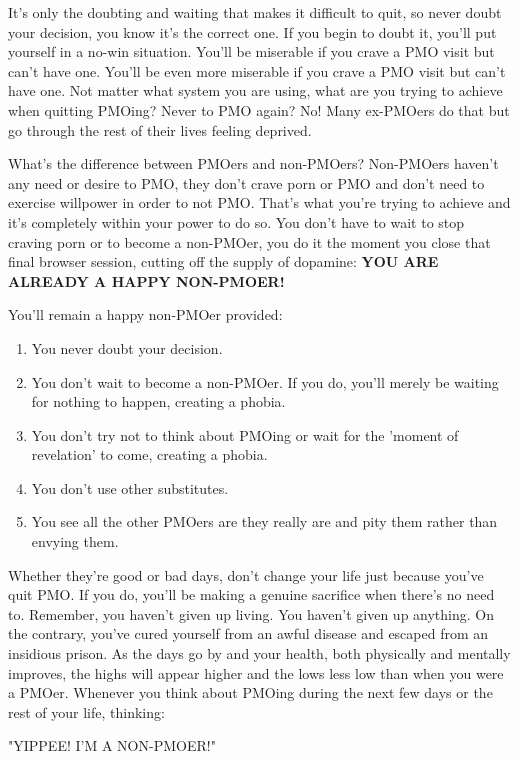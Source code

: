 \documentclass[easypeasy.tex]{subfiles}
\begin{document}
It's only the doubting and waiting that makes it difficult to quit, so never doubt your decision, you know it's the correct one. If you begin to doubt it, you'll put yourself in a no-win situation. You'll be miserable if you crave a PMO visit but can't have one. You'll be even more miserable if you crave a PMO visit but can't have one. Not matter what system you are using, what are you trying to achieve when quitting PMOing? Never to PMO again? No! Many ex-PMOers do that but go through the rest of their lives feeling deprived.

What's the difference between PMOers and non-PMOers? Non-PMOers haven't any need or desire to PMO, they don't crave porn or PMO and don't need to exercise willpower in order to not PMO. That's what you're trying to achieve and it's completely within your power to do so. You don't have to wait to stop craving porn or to become a non-PMOer, you do it the moment you close that final browser session, cutting off the supply of dopamine: \textbf{YOU ARE ALREADY A HAPPY NON-PMOER!}

  You'll remain a happy non-PMOer provided:
\begin{enumerate}
  \item You never doubt your decision.
  \item You don't wait to become a non-PMOer. If you do, you'll merely be waiting for nothing to happen, creating a phobia.
  \item You don't try not to think about PMOing or wait for the 'moment of revelation' to come, creating a phobia.
  \item You don't use other substitutes.
  \item You see all the other PMOers are they really are and pity them rather than envying them.
\end{enumerate}
  
Whether they're good or bad days, don't change your life just because you've quit PMO. If you do, you'll be making a genuine sacrifice when there's no need to. Remember, you haven't given up living. You haven't given up anything. On the contrary, you've cured yourself from an awful disease and escaped from an insidious prison. As the days go by and your health, both physically and mentally improves, the highs will appear higher and the lows less low than when you were a PMOer. Whenever you think about PMOing during the next few days or the rest of your life, thinking:

{\Large "YIPPEE! I'M A NON-PMOER!"}
\end{document}
